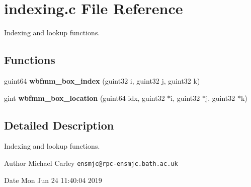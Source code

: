 \section{indexing.\-c File Reference}
\label{indexing_8c}


Indexing and lookup functions.  


\subsection*{Functions}
\begin{DoxyCompactItemize}
\item 
guint64 {\bf wbfmm\-\_\-box\-\_\-index} (guint32 i, guint32 j, guint32 k)
\item 
gint {\bf wbfmm\-\_\-box\-\_\-location} (guint64 idx, guint32 $\ast$i, guint32 $\ast$j, guint32 $\ast$k)
\end{DoxyCompactItemize}


\subsection{Detailed Description}
Indexing and lookup functions. \begin{DoxyAuthor}{Author}
Michael Carley {\tt ensmjc@rpc-\/ensmjc.\-bath.\-ac.\-uk} 
\end{DoxyAuthor}
\begin{DoxyDate}{Date}
Mon Jun 24 11\-:40\-:04 2019 
\end{DoxyDate}
